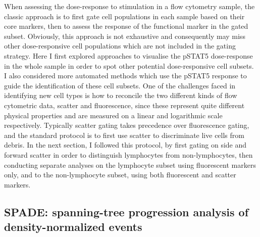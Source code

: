 When assessing the dose-response to stimulation in a flow cytometry sample, the classic approach is to first gate cell populations in each sample based on their core markers,
then to assess the response of the functional marker in the gated subset.
Obviously, this approach is not exhaustive and consequently may miss other dose-responsive cell populations which are not included in the gating strategy.
Here I first explored approaches to visualise the pSTAT5 dose-response in the whole sample in order to spot other potential dose-responsive cell subsets.
I also considered more automated methods which use the pSTAT5 response to guide the identification of these cell subsets.
One of the challenges faced in identifying new cell types is how to reconcile the two different kinds of flow cytometric data, scatter and fluorescence, since these represent quite different physical properties and are measured on a linear and logarithmic scale respectively.
Typically scatter gating takes precedence over fluorescence gating, and the standard protocol is to first use scatter to discriminate live cells from debris.
In the next section, I followed this protocol, by first gating on side and forward scatter in order to distinguish lymphocytes from non-lymphocytes, then conducting separate analyses on the lymphocyte subset using fluorescent markers only, and to the non-lymphocyte subset, using both fluorescent and scatter markers.


\subsection{SPADE: spanning-tree progression analysis of density-normalized events}

